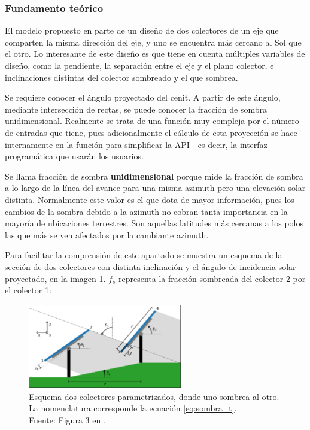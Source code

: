 \subsubsection{Fundamento teórico}

El modelo propuesto en \cite{Anderson_Jensen_2024} parte de un diseño de dos colectores de un eje que comparten la misma dirección del eje, y uno se encuentra más cercano al Sol que el otro. Lo interesante de este diseño es que tiene en cuenta múltiples variables de diseño, como la pendiente, la separación entre el eje y el plano colector, e inclinaciones distintas del colector sombreado y el que sombrea.

Se requiere conocer el ángulo proyectado del cenit. A partir de este ángulo, mediante intersección de rectas, se puede conocer la fracción de sombra unidimensional. Realmente se trata de una función muy compleja por el número de entradas que tiene, pues adicionalmente el cálculo de esta proyección se hace internamente en la función para simplificar la API - es decir, la interfaz programática que usarán los usuarios.

Se llama fracción de sombra \textbf{unidimensional} porque mide la fracción de sombra a lo largo de la línea del avance para una misma azimuth pero una elevación solar distinta. Normalmente este valor es el que dota de mayor información, pues los cambios de la sombra debido a la azimuth no cobran tanta importancia en la mayoría de ubicaciones terrestres. Son aquellas latitudes más cercanas a los polos las que más se ven afectados por la cambiante azimuth.

Para facilitar la comprensión de este apartado se muestra un esquema de la sección de dos colectores con distinta inclinación y el ángulo de incidencia solar proyectado, en la imagen \ref{fig:fraccion_sombra}. $f_s$ representa la fracción sombreada del colector 2 por el colector 1:

\begin{figure}[H]
    \centering
    \includegraphics[width=0.6\textwidth]{./images/shading_1d/Anderson_Jensen_Fig3.png}
    \caption{Esquema dos colectores parametrizados, donde uno sombrea al otro. La nomenclatura corresponde la ecuación \ref{eq:sombra_t}.\\Fuente: Figura 3 en \cite{Anderson_Jensen_2024}.}
    \label{fig:fraccion_sombra}
\end{figure}

